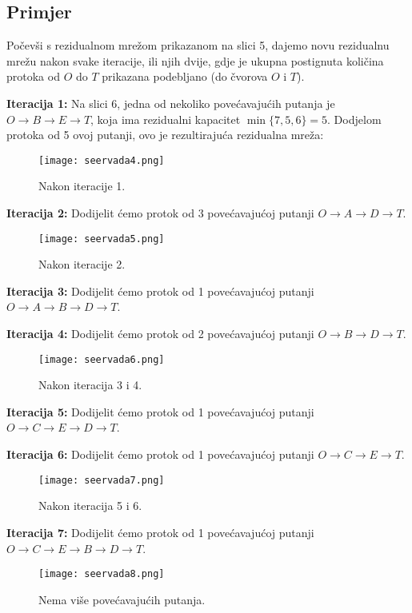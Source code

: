 \documentclass[11pt, a4paper]{article}
\begin{document}
	\subsection{Primjer}
	
	
	Počevši s rezidualnom mrežom prikazanom na slici 5, dajemo novu rezidualnu mrežu nakon svake iteracije, ili njih dvije, gdje je ukupna postignuta količina protoka od $O$ do $T$ prikazana podebljano (do čvorova $O$ i $T$).
	
	\textbf{Iteracija 1:} Na slici 6, jedna od nekoliko povećavajućih putanja je $O \to B \to E \to T$, koja ima rezidualni kapacitet $\min\{7, 5, 6\} = 5$. Dodjelom protoka od 5 ovoj putanji, ovo je rezultirajuća rezidualna mreža:
	\begin{figure}[h]
		\centering
		\texttt{[image: seervada4.png]}
		\caption{Nakon iteracije 1.}
		\label{fig:slika7}
	\end{figure}
	
	\pagebreak
	\textbf{Iteracija 2:} Dodijelit ćemo protok od 3 povećavajućoj putanji $O \to A \to D \to T$.
	\begin{figure}[h]
		\centering
		\texttt{[image: seervada5.png]}
		\caption{Nakon iteracije 2.}
		\label{fig:slika8}
	\end{figure}
	
	\textbf{Iteracija 3:} Dodijelit ćemo protok od 1 povećavajućoj putanji $O \to A \to B \to D \to T$.
	
	\textbf{Iteracija 4:} Dodijelit ćemo protok od 2 povećavajućoj putanji $O \to B \to D \to T$.
	\begin{figure}[h]
		\centering
		\texttt{[image: seervada6.png]}
		\caption{Nakon iteracija 3 i 4.}
		\label{fig:slika9}
	\end{figure}
	
	\textbf{Iteracija 5:} Dodijelit ćemo protok od 1 povećavajućoj putanji $O \to C \to E \to D \to T$.
	
	\textbf{Iteracija 6:} Dodijelit ćemo protok od 1 povećavajućoj putanji $O \to C \to E \to T$.
	\begin{figure}[h]
		\centering
		\texttt{[image: seervada7.png]}
		\caption{Nakon iteracija 5 i 6.}
		\label{fig:slika10}
	\end{figure}
	
	\pagebreak
	\textbf{Iteracija 7:} Dodijelit ćemo protok od 1 povećavajućoj putanji $O \to C \to E \to B \to D \to T$.
	\begin{figure}[h]
		\centering
		\texttt{[image: seervada8.png]}
		\caption{Nema više povećavajućih putanja.}
		\label{fig:slika11}
	\end{figure}
	
\end{document}
